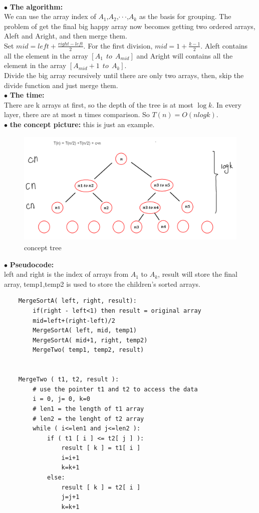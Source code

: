 \documentclass[12pt,a4paper]{article}
\newcommand{\question}[1]{\bigskip\noindent{\textbf{Q{#1} solution}}}
\begin{document}
\question{14.A}\\
$\bullet$ \textbf{The algorithm:}\\
We can use the array index of $A_1$,$A_2$,$\cdot \cdot \cdot$,$A_k$ as the basis for grouping. The problem of get the final big happy array now becomes getting two ordered arrays, Aleft and Aright, and then merge them.\\
Set $mid = left+\frac{right-left}{2}$. For the first division, $mid = 1+\frac{k-1}{2}$. Aleft contains all the element in the array $[A_1 \ \ to \ \ A_{mid}]$ and Aright will contains all the element in the array $[A_{mid}+1 \ \ to \ \ A_k]$.\\
Divide the big array recursively until there are only two arrays, then, skip the divide function and just merge them.\\
$\bullet$ \textbf{The time:}\\
There are k arrays at first, so the depth of the tree is at most $\log{k}$. In every layer, there are at most n times comparison. So $T(n) = O(nlogk)$.\\
$\bullet$ \textbf{the concept picture:} this is just an example.
	\begin{figure}[H]
	\centering %
	\includegraphics[height=5.5cm,width=12.5cm]{picture//Q14A.png}
	\caption{concept tree}
	\end{figure}
\noindent
$\bullet$ \textbf{Pseudocode:}\\
	left and right is the index of arrays from $A_1$ to $A_k$, result will store the final array, temp1,temp2 is used to store the children's sorted arrays.
	\begin{lstlisting}
	MergeSortA( left, right, result):
		if(right - left<1) then result = original array
		mid=left+(right-left)/2
		MergeSortA( left, mid, temp1)
		MergeSortA( mid+1, right, temp2)
		MergeTwo( temp1, temp2, result)


	MergeTwo ( t1, t2, result ):
		# use the pointer t1 and t2 to access the data
		i = 0, j= 0, k=0
		# len1 = the length of t1 array
		# len2 = the lenght of t2 array
		while ( i<=len1 and j<=len2 ):
			if ( t1 [ i ] <= t2[ j ] ):
				result [ k ] = t1[ i ]
				i=i+1
				k=k+1
			else:
				result [ k ] = t2[ i ]
				j=j+1
				k=k+1
	\end{lstlisting}
\end{document}
